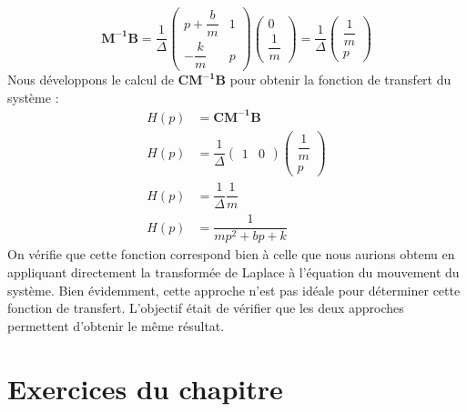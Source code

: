 \[
    \boldsymbol{M^{-1}}\boldsymbol{B}=
    \dfrac{1}{\Delta}
     \begin{pmatrix}
        p+\dfrac{b}{m} & 1 \\[1em]
        -\dfrac{k}{m} & p
    \end{pmatrix}
    \begin{pmatrix} 0 \\[1em] \dfrac{1}{m} \end{pmatrix}=
     \dfrac{1}{\Delta}
     \begin{pmatrix} \dfrac{1}{m} \\[1em] p \end{pmatrix}
\]
Nous développons le calcul de $\boldsymbol{C}\boldsymbol{M^{-1}}\boldsymbol{B}$ 
pour obtenir la fonction de transfert du système :
\begin{align*}
    H(p)&=\boldsymbol{C}\boldsymbol{M^{-1}}\boldsymbol{B} \\
    H(p)&=\dfrac{1}{\Delta}
    \begin{pmatrix} 1 & 0 \end{pmatrix}
    \begin{pmatrix} \dfrac{1}{m} \\[1em] p \end{pmatrix}\\
    H(p)&=\dfrac{1}{\Delta} \dfrac{1}{m}\\
    H(p)&=\dfrac{1}{mp^2+bp+k}
\end{align*}
On vérifie que cette fonction correspond bien à celle que nous aurions obtenu
en appliquant directement la transformée de Laplace à l'équation du mouvement
du système.
Bien évidemment, cette approche n'est pas idéale pour déterminer cette fonction
de transfert. L'objectif était de vérifier que les deux approches permettent
d'obtenir le même résultat.
\newpage
\section{Exercices du chapitre}
\small

\setcounter{numexos}{0}
\normalsize
\newpage
\restoregeometry
\captionsetup{width=0.9\linewidth}
